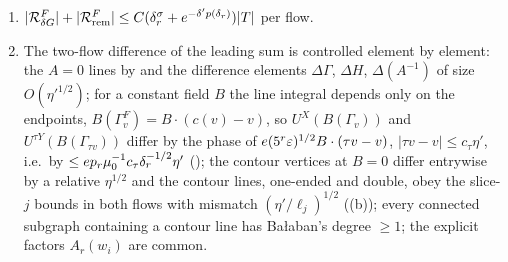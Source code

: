 \begin{lemma}
\begin{enumerate}[label=\textup{(\arabic*)},leftmargin=*]
\item $|\mathcal R^F_{\delta G}|+|\mathcal R^F_{\rm rem}|\le C(\delta_r^\sigma+e^{-\delta'p(\delta_r)})|T|$ per flow.
\item The two-flow difference of the leading sum is controlled element by element: the $A=0$ lines by  and the difference elements $\Delta\Gamma$, $\Delta H$, $\Delta(A^{-1})$ of size $O(\eta'^{1/2})$; for a constant field $B$ the line integral depends only on the endpoints, $B(\Gamma^F_v)=B\cdot(c(v)-v)$, so $U^X(B(\Gamma_v))$ and $U^{\tau Y}(B(\Gamma_{\tau v}))$ differ by the phase of $e(5^r\varepsilon)^{1/2}B\cdot(\tau v-v)$, $|\tau v-v|\le c_\tau\eta'$, i.e.\ by $\le ep_r\mu_0^{-1}c_\tau\delta_r^{-1/2}\eta'$ (\cite[(3.2)]{K1}); the contour vertices \cite[(3.24)--(3.26)]{K1} at $B=0$ differ entrywise by a relative $\eta^{1/2}$ and the contour lines, one-ended and double, obey the slice-$j$ bounds in both flows with mismatch $(\eta'/\ell_j)^{1/2}$ ((b)); every connected subgraph containing a contour line has Ba{\l}aban's degree $\ge1$; the explicit factors $A_r(w_i)$ are common.
\end{enumerate}
\end{lemma}
